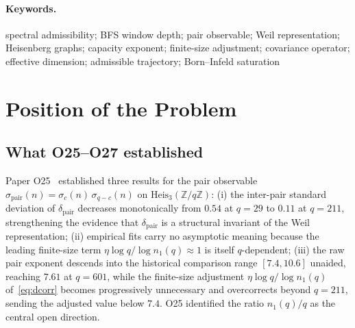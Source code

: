 \documentclass[11pt,a4paper]{article}
\theoremstyle{definition}
\begin{document}
\begin{abstract}
    This is a finite-data value of the stated protocol and not an invariant: the extended
    recomputation of O29 finds rank three modal, at $32/50$ pairs for $q = 101$ and $103/105$ for
    $q = 211$.
    These three resolved modes fill $H_{\mathrm{eff}}$ at the stated threshold.
    The gap from the spin-$\tfrac{1}{2}$ prediction $d_\rho^2 = 4$ reflects that
    $H_{\mathrm{eff}} \neq V_\rho$, and stays open.
    O29 audits what the measurement identifies: the projected-coordinate relation
    $\pi_{q-c}(v) = \overline{\pi_c(v)}$ is motivated by the Weil-block identity
    $\rho_{q-c} = \bar\rho_c$ without following from it, the finite-precision diagnostics are
    compatible with an adjoint reading of $H_{\mathrm{eff}}$ without deriving that carrier, and
    $V_\rho$ is supplied elsewhere rather than recovered from these data.
    Interpretively, the combined result separates a finite-$q$ calibration diagnostic from its
    proved asymptotic law, and leaves the spin-$\tfrac{1}{2}$ dimension unmeasured by the
    conjugate-pair covariance.
  \end{abstract}

  \paragraph{Keywords.}
    spectral admissibility; BFS window depth; pair observable; Weil representation; Heisenberg graphs; capacity
    exponent; finite-size adjustment; covariance operator; effective dimension; admissible trajectory; Born--Infeld
    saturation

    \clearpage
    \tableofcontents

    \clearpage

  \section{Position of the Problem}

  \subsection{What O25--O27 established}

    Paper O25~\cite{Beau2026a29} established three results for the pair observable
    $\sigma_{\mathrm{pair}}(n) = \sigma_c(n)\,\sigma_{q-c}(n)$ on
    $\mathrm{Heis}_3(\mathbb{Z}/q\mathbb{Z})$:
    (i) the inter-pair standard deviation of $\delta_{\mathrm{pair}}$ decreases monotonically
    from $0.54$ at $q = 29$ to $0.11$ at $q = 211$, strengthening the evidence that
    $\delta_{\mathrm{pair}}$ is a structural invariant of the Weil representation;
    (ii) empirical fits carry no asymptotic meaning because the leading finite-size term
    $\eta\log q/\log n_1(q) \approx 1$ is itself $q$-dependent;
    (iii) the raw pair exponent descends into the historical comparison range $[7.4, 10.6]$
    unaided, reaching $7.61$ at $q = 601$, while the finite-size adjustment
    $\eta\log q/\log n_1(q)$ of~\eqref{eq:dcorr} becomes progressively unnecessary and
    overcorrects beyond $q = 211$, sending the adjusted value below $7.4$.
    O25 identified the ratio $n_1(q)/q$ as the central open direction.
\end{document}
